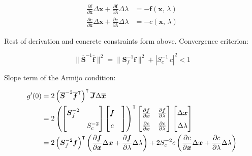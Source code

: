 \begin{align}
\frac{\partial\boldsymbol{f}}{\partial\boldsymbol{x}}\Delta\boldsymbol{x} + \frac{\partial\boldsymbol{f}}{\partial\lambda}\Delta\lambda &= -\boldsymbol{f}(\boldsymbol{x},\,\lambda) \\
\frac{\partial c}{\partial\boldsymbol{x}}\Delta\boldsymbol{x} + \frac{\partial c}{\partial\lambda}\Delta\lambda &= -c(\boldsymbol{x},\,\lambda)
\end{align}

Rest of derivation and concrete constraints form above.
Convergence criterion:

\begin{equation}
\lVert \overline{\boldsymbol{S}}^{-1}\overline{\boldsymbol{f}} \rVert^2 = \lVert \boldsymbol{S}_{f}^{-1}\boldsymbol{f} \rVert^2 + |S_{c}^{-1}\,c|^2 < 1
\end{equation}

Slope term of the Armijo condition:

\begin{align*}
\renewcommand{\arraystretch}{1.5}
g'(0) &= 2\left(\overline{\boldsymbol{S}}^{-2}\overline{\boldsymbol{f}}^\intercal\right)^\intercal\overline{\boldsymbol{J}}\Delta\overline{\boldsymbol{x}} \\
&= 2
\left(
\begin{bmatrix}
\boldsymbol{S}_{f}^{-2} & \\
& S_{c}^{-2}
\end{bmatrix}
\begin{bmatrix}
\boldsymbol{f} & \\
c
\end{bmatrix}
\right)^\intercal
\begin{bmatrix}
\frac{\partial\boldsymbol{f}}{\partial\boldsymbol{x}} & \frac{\partial\boldsymbol{f}}{\partial\lambda} \\
\frac{\partial c}{\partial \boldsymbol{x}} &  \frac{\partial c}{\partial \lambda}
\end{bmatrix}
\begin{bmatrix}
\Delta\boldsymbol{x} \\
\Delta\lambda
\end{bmatrix} \\
&= 2\left(\boldsymbol{S}_{f}^{-2}\boldsymbol{f}\right)^\intercal\left(\frac{\partial\boldsymbol{f}}{\partial\boldsymbol{x}}\Delta\boldsymbol{x} + \frac{\partial\boldsymbol{f}}{\partial\lambda}\Delta\lambda\right) + 2S_{c}^{-2}c\left(\frac{\partial c}{\partial\boldsymbol{x}}\Delta\boldsymbol{x} + \frac{\partial c}{\partial\lambda}\Delta\lambda\right)
\end{align*}

